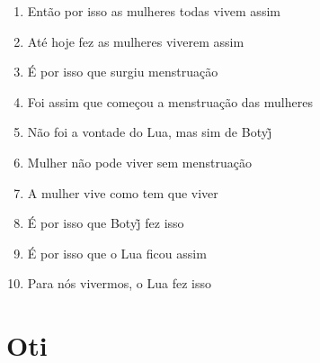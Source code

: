 \begin{enumerate}
\begin{center}\end{center}

\item Então por isso as mulheres todas vivem assim
\item Até hoje fez as mulheres viverem assim
\item É por isso que surgiu menstruação
\item Foi assim que começou a menstruação das mulheres
\item Não foi a vontade do Lua, mas sim de Botyj̃
\item Mulher não pode viver sem menstruação
\item A mulher vive como tem que viver
\item É por isso que Botyj̃ fez isso
\item É por isso que o Lua ficou assim
\item Para nós vivermos, o Lua fez isso
\end{enumerate}

\chapter{Oti}

